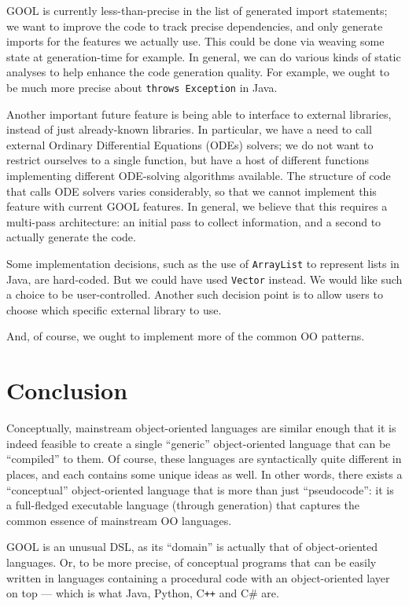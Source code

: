 \documentclass[sigplan,review,anonymous,prologue,dvipsnames]{acmart}
\newcommand{\Csharp}{C\#}
\newcommand{\Cplusplus}{C\texttt{++}}
\begin{document}
GOOL is currently less-than-precise in the list of generated import statements;
we want to improve the code to track precise dependencies, and only generate
imports for the features we actually use. This could be done via weaving
some state at generation-time for example.  In general, we can do various 
kinds of static analyses to help enhance the code generation quality.
For example, we ought to be much more precise about \verb|throws Exception|
in Java.

Another important future feature is being able to interface to external libraries,
instead of just already-known libraries. In particular, we have a need to
call external Ordinary Differential Equations (ODEs) solvers; we do not
want to restrict ourselves to a single function, but have a host of
different functions implementing different ODE-solving algorithms available.
The structure of code that calls ODE solvers varies considerably, so that we cannot
implement this feature with current GOOL features.  In general, we believe
that this requires a multi-pass architecture: an initial pass to collect
information, and a second to actually generate the code.

Some implementation decisions, such as the use of \verb|ArrayList| to represent
lists in Java, are hard-coded. But we could have used \verb|Vector| instead.
We would like such a choice to be user-controlled. Another such decision
point is to allow users to choose which specific external library to use.

And, of course, we ought to implement more of the common OO patterns.

\section{Conclusion} \label{sec:conclusions}

Conceptually, mainstream object-oriented languages are similar enough that it
is indeed feasible to create a single ``generic'' object-oriented language that
can be ``compiled'' to them.  Of course, these languages are syntactically
quite different in places, and each contains some unique ideas as well.
In other words, there exists a ``conceptual'' object-oriented language that
is more than just ``pseudocode'': it is a full-fledged executable language
(through generation) that captures the common essence of mainstream OO
languages.

GOOL is an unusual DSL, as its ``domain'' is actually that of object-oriented
languages. Or, to be more precise, of conceptual programs that can be
easily written in languages containing a procedural code with an
object-oriented layer on top --- which is what Java, Python, \Cplusplus{} and
\Csharp{} are.
\end{document}
